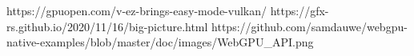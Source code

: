 

https://gpuopen.com/v-ez-brings-easy-mode-vulkan/
https://gfx-rs.github.io/2020/11/16/big-picture.html
https://github.com/samdauwe/webgpu-native-examples/blob/master/doc/images/WebGPU\_API.png